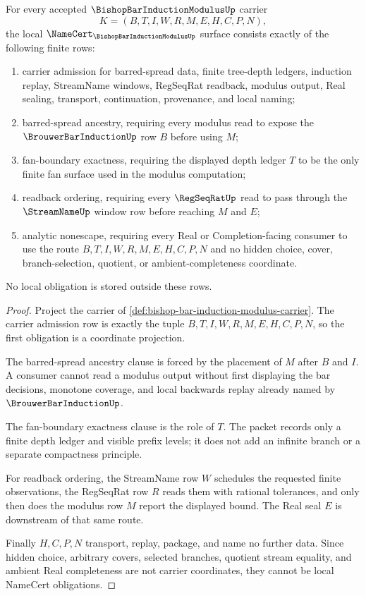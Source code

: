 \begin{theorem}
\label{thm:bishop-bar-induction-modulus-namecert-obligations}
For every accepted $\BishopBarInductionModulusUp$ carrier
$$
K=(B,T,I,W,R,M,E,H,C,P,N),
$$
the local $\NameCert_{\BishopBarInductionModulusUp}$ surface consists exactly of the following finite rows:
\begin{enumerate}
\item carrier admission for barred-spread data, finite tree-depth ledgers, induction replay, StreamName windows, RegSeqRat readback, modulus output, Real sealing, transport, continuation, provenance, and local naming;
\item barred-spread ancestry, requiring every modulus read to expose the $\BrouwerBarInductionUp$ row $B$ before using $M$;
\item fan-boundary exactness, requiring the displayed depth ledger $T$ to be the only finite fan surface used in the modulus computation;
\item readback ordering, requiring every $\RegSeqRatUp$ read to pass through the $\StreamNameUp$ window row before reaching $M$ and $E$;
\item analytic nonescape, requiring every Real or Completion-facing consumer to use the route $B,T,I,W,R,M,E,H,C,P,N$ and no hidden choice, cover, branch-selection, quotient, or ambient-completeness coordinate.
\end{enumerate}
No local obligation is stored outside these rows.
\end{theorem}
\begin{proof}
Project the carrier of \autoref{def:bishop-bar-induction-modulus-carrier}. The carrier admission row is exactly the tuple $B,T,I,W,R,M,E,H,C,P,N$, so the first obligation is a coordinate projection.

The barred-spread ancestry clause is forced by the placement of $M$ after $B$ and $I$. A consumer cannot read a modulus output without first displaying the bar decisions, monotone coverage, and local backwards replay already named by $\BrouwerBarInductionUp$.

The fan-boundary exactness clause is the role of $T$. The packet records only a finite depth ledger and visible prefix levels; it does not add an infinite branch or a separate compactness principle.

For readback ordering, the StreamName row $W$ schedules the requested finite observations, the RegSeqRat row $R$ reads them with rational tolerances, and only then does the modulus row $M$ report the displayed bound. The Real seal $E$ is downstream of that same route.

Finally $H,C,P,N$ transport, replay, package, and name no further data. Since hidden choice, arbitrary covers, selected branches, quotient stream equality, and ambient Real completeness are not carrier coordinates, they cannot be local NameCert obligations.
\end{proof}

